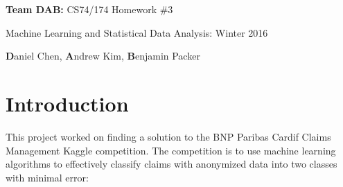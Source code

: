 \documentclass[twoside,11pt]{article}
\theoremstyle{definition}
\begin{document}
\clearpage
\thispagestyle{empty}
\centerline{\Large {\bf Team DAB: } CS74/174 Homework \#3}
\centerline{Machine Learning and Statistical Data Analysis: Winter 2016}
\centerline{{\bf D}aniel Chen, {\bf A}ndrew Kim, {\bf B}enjamin Packer}



\tableofcontents
\newpage
\clearpage
\setcounter{page}{1}

\section{Introduction}

  This project worked on finding a solution to the BNP Paribas Cardif Claims Management Kaggle competition. The competition is to use machine learning algorithms to effectively classify claims with anonymized data into two classes with minimal error:
\end{document}
